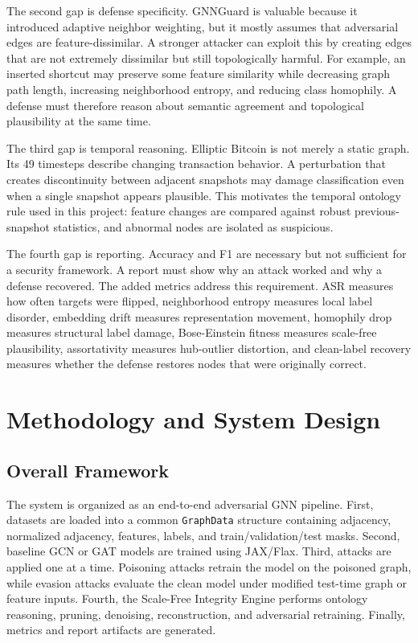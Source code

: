 \documentclass[12pt,oneside]{report}
\begin{document}
The second gap is defense specificity. GNNGuard is valuable because it introduced adaptive neighbor weighting, but it mostly assumes that adversarial edges are feature-dissimilar. A stronger attacker can exploit this by creating edges that are not extremely dissimilar but still topologically harmful. For example, an inserted shortcut may preserve some feature similarity while decreasing graph path length, increasing neighborhood entropy, and reducing class homophily. A defense must therefore reason about semantic agreement and topological plausibility at the same time.

The third gap is temporal reasoning. Elliptic Bitcoin is not merely a static graph. Its 49 timesteps describe changing transaction behavior. A perturbation that creates discontinuity between adjacent snapshots may damage classification even when a single snapshot appears plausible. This motivates the temporal ontology rule used in this project: feature changes are compared against robust previous-snapshot statistics, and abnormal nodes are isolated as suspicious.

The fourth gap is reporting. Accuracy and F1 are necessary but not sufficient for a security framework. A report must show why an attack worked and why a defense recovered. The added metrics address this requirement. ASR measures how often targets were flipped, neighborhood entropy measures local label disorder, embedding drift measures representation movement, homophily drop measures structural label damage, Bose-Einstein fitness measures scale-free plausibility, assortativity measures hub-outlier distortion, and clean-label recovery measures whether the defense restores nodes that were originally correct.

\chapter{Methodology and System Design}
\section{Overall Framework}
The system is organized as an end-to-end adversarial GNN pipeline. First, datasets are loaded into a common \texttt{GraphData} structure containing adjacency, normalized adjacency, features, labels, and train/validation/test masks. Second, baseline GCN or GAT models are trained using JAX/Flax. Third, attacks are applied one at a time. Poisoning attacks retrain the model on the poisoned graph, while evasion attacks evaluate the clean model under modified test-time graph or feature inputs. Fourth, the Scale-Free Integrity Engine performs ontology reasoning, pruning, denoising, reconstruction, and adversarial retraining. Finally, metrics and report artifacts are generated.
\end{document}
